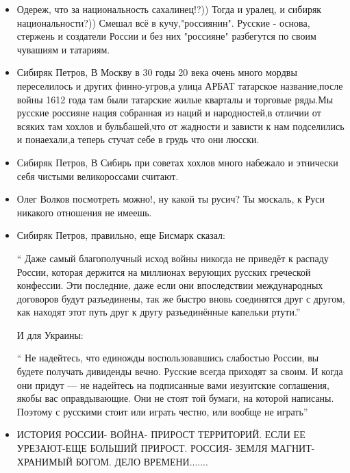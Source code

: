 \begin{itemize}
\item {}

Одереж, что за национальность сахалинец!?)) Тогда и уралец, и сибиряк
национальности?)) Смешал всё в кучу,"россиянин". Русские -
основа, стержень и создатели России и без них "россияне"
разбегутся по своим чувашиям и татариям.

\item {}

Сибиряк Петров, В Москву в 30 годы 20 века очень много мордвы переселилось и других финно-угров,а улица АРБАТ татарское название,после войны 1612 года там были татарские жилые кварталы и торговые ряды.Мы русские россияне нация собранная из наций и народностей,в отличии от всяких там хохлов и бульбашей,что от жадности и зависти к нам подселились и понаехали,а теперь стучат себе в грудь что они люсски.

\item {}

Сибиряк Петров, В Сибирь при советах хохлов много набежало и этнически себя чистыми великороссами считают.

\item {}

Олег Волков посмотреть можно!, ну какой ты русич? Ты москаль, к Руси никакого отношения не имеешь.

\item {}

Сибиряк Петров, правильно, еще Бисмарк сказал:

\enquote{ Даже самый благополучный исход войны никогда не приведёт к распаду России, которая держится на миллионах верующих русских греческой конфессии. Эти последние, даже если они впоследствии международных договоров будут разъединены, так же быстро вновь соединятся друг с другом, как находят этот путь друг к другу разъединённые капельки ртути.}

И для Украины:

\enquote{ Не надейтесь, что единожды воспользовавшись слабостью России, вы будете получать дивиденды вечно. Русские всегда приходят за своим. И когда они придут — не надейтесь на подписанные вами иезуитские соглашения, якобы вас оправдывающие. Они не стоят той бумаги, на которой написаны. Поэтому с русскими стоит или играть честно, или вообще не играть}

\item {}

ИСТОРИЯ РОССИИ- ВОЙНА- ПРИРОСТ ТЕРРИТОРИЙ. ЕСЛИ ЕЕ УРЕЗАЮТ-ЕЩЕ БОЛЬШИЙ ПРИРОСТ.
РОССИЯ- ЗЕМЛЯ МАГНИТ- ХРАНИМЫЙ БОГОМ. ДЕЛО ВРЕМЕНИ.......


\end{itemize}
